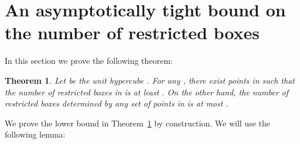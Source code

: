 \documentclass[11pt]{article}
\newtheorem{theorem}{Theorem}
\begin{document}
\section{An asymptotically tight bound on the number of restricted
boxes}\label{sec:restricted} 

In this section we prove the following theorem:

\begin{theorem}\label{thm:restricted}
Let  be the unit hypercube .
For any , there exist  points in 
such that the number of restricted boxes in 
is at least
.
On the other hand,
the number of restricted boxes determined by any set of  points in 
is at most
.
\end{theorem}


We prove the lower bound in Theorem~\ref{thm:restricted} by construction.
We will use the following lemma:
\end{document}

